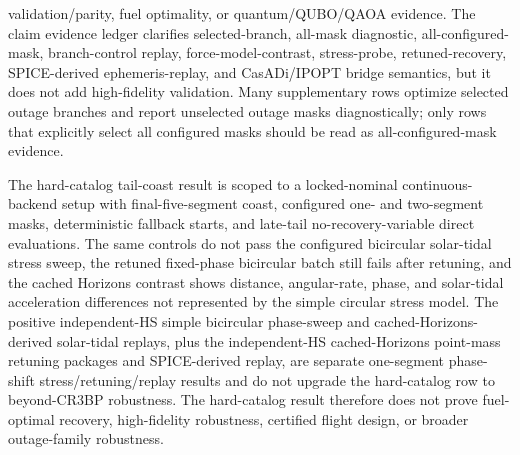 \documentclass[preprint,12pt]{elsarticle}
\begin{document}
validation/parity, fuel optimality, or quantum/QUBO/QAOA evidence. The claim evidence ledger clarifies selected-branch, all-mask diagnostic, all-configured-mask, branch-control replay, force-model-contrast, stress-probe, retuned-recovery, SPICE-derived ephemeris-replay, and CasADi/IPOPT bridge semantics, but it does not add high-fidelity validation. Many supplementary rows optimize selected outage branches and report unselected outage masks diagnostically; only rows that explicitly select all configured masks should be read as all-configured-mask evidence.

The hard-catalog tail-coast result is scoped to a locked-nominal continuous-backend setup with final-five-segment coast, configured one- and two-segment masks, deterministic fallback starts, and late-tail no-recovery-variable direct evaluations. The same controls do not pass the configured bicircular solar-tidal stress sweep, the retuned fixed-phase bicircular batch still fails after retuning, and the cached Horizons contrast shows distance, angular-rate, phase, and solar-tidal acceleration differences not represented by the simple circular stress model. The positive independent-HS simple bicircular phase-sweep and cached-Horizons-derived solar-tidal replays, plus the independent-HS cached-Horizons point-mass retuning packages and SPICE-derived replay, are separate one-segment phase-shift stress/retuning/replay results and do not upgrade the hard-catalog row to beyond-CR3BP robustness. The hard-catalog result therefore does not prove fuel-optimal recovery, high-fidelity robustness, certified flight design, or broader outage-family robustness.
\end{document}
